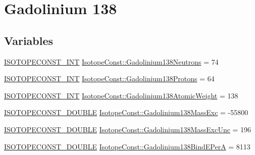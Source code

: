 \hypertarget{group___isotope_const-_gadolinium-_gd138}{}\section{Gadolinium 138}
\label{group___isotope_const-_gadolinium-_gd138}
\subsection*{Variables}
\begin{DoxyCompactItemize}
\item 
\mbox{\hyperlink{group___isotope_const-_macros_ga5f18360b3e99483a35c32d789e62621c}{I\+S\+O\+T\+O\+P\+E\+C\+O\+N\+S\+T\+\_\+\+I\+NT}} \mbox{\hyperlink{group___isotope_const-_gadolinium-_gd138_ga0485cd4e30355d1d225ae5352338672b}{Isotope\+Const\+::\+Gadolinium138\+Neutrons}} = 74
\item 
\mbox{\hyperlink{group___isotope_const-_macros_ga5f18360b3e99483a35c32d789e62621c}{I\+S\+O\+T\+O\+P\+E\+C\+O\+N\+S\+T\+\_\+\+I\+NT}} \mbox{\hyperlink{group___isotope_const-_gadolinium-_gd138_ga10932b5c2912c2225927899e24e55c6a}{Isotope\+Const\+::\+Gadolinium138\+Protons}} = 64
\item 
\mbox{\hyperlink{group___isotope_const-_macros_ga5f18360b3e99483a35c32d789e62621c}{I\+S\+O\+T\+O\+P\+E\+C\+O\+N\+S\+T\+\_\+\+I\+NT}} \mbox{\hyperlink{group___isotope_const-_gadolinium-_gd138_ga7a5607f75bf66f69ae44259bb943df29}{Isotope\+Const\+::\+Gadolinium138\+Atomic\+Weight}} = 138
\item 
\mbox{\hyperlink{group___isotope_const-_macros_ga8f45a7272ce02c0b4c65c44636ed719a}{I\+S\+O\+T\+O\+P\+E\+C\+O\+N\+S\+T\+\_\+\+D\+O\+U\+B\+LE}} \mbox{\hyperlink{group___isotope_const-_gadolinium-_gd138_gab616fa7bd68ce3a3581e10f7e3871c68}{Isotope\+Const\+::\+Gadolinium138\+Mass\+Exc}} = -\/55800
\item 
\mbox{\hyperlink{group___isotope_const-_macros_ga8f45a7272ce02c0b4c65c44636ed719a}{I\+S\+O\+T\+O\+P\+E\+C\+O\+N\+S\+T\+\_\+\+D\+O\+U\+B\+LE}} \mbox{\hyperlink{group___isotope_const-_gadolinium-_gd138_gafff6fb0990b5bb8ad1efae1b92616cd0}{Isotope\+Const\+::\+Gadolinium138\+Mass\+Exc\+Unc}} = 196
\item 
\mbox{\hyperlink{group___isotope_const-_macros_ga8f45a7272ce02c0b4c65c44636ed719a}{I\+S\+O\+T\+O\+P\+E\+C\+O\+N\+S\+T\+\_\+\+D\+O\+U\+B\+LE}} \mbox{\hyperlink{group___isotope_const-_gadolinium-_gd138_gaa9a341c22c6aa35d46ac443f5d31813b}{Isotope\+Const\+::\+Gadolinium138\+Bind\+E\+PerA}} = 8113
\item 

\end{DoxyCompactItemize}

